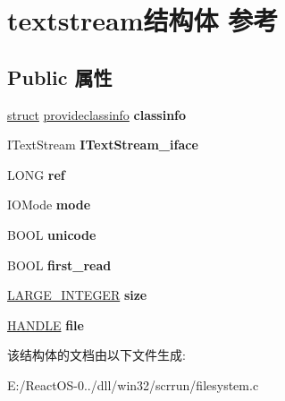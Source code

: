 \hypertarget{structtextstream}{}\section{textstream结构体 参考}
\label{structtextstream}
\subsection*{Public 属性}
\begin{DoxyCompactItemize}
\item 
\mbox{\label{structtextstream_a85e529673460ccf79baa7374fedab08e}} 
\hyperlink{interfacestruct}{struct} \hyperlink{structprovideclassinfo}{provideclassinfo} {\bfseries classinfo}
\item 
\mbox{\label{structtextstream_a68ec6da2e128bac649f245c699f9c0b7}} 
I\+Text\+Stream {\bfseries I\+Text\+Stream\+\_\+iface}
\item 
\mbox{\label{structtextstream_aa6ab5f97fa5849f7386821281af44870}} 
L\+O\+NG {\bfseries ref}
\item 
\mbox{\label{structtextstream_a24e10f6ff455f9db49da84fda8a8d5ef}} 
I\+O\+Mode {\bfseries mode}
\item 
\mbox{\label{structtextstream_a020994705dc826331d0bce551967be6e}} 
B\+O\+OL {\bfseries unicode}
\item 
\mbox{\label{structtextstream_a03be5a0d8e734fd9c9b59d2ee13a624a}} 
B\+O\+OL {\bfseries first\+\_\+read}
\item 
\mbox{\label{structtextstream_a97c0a836897c8e4ae2a5217a937e8980}} 
\hyperlink{union___l_a_r_g_e___i_n_t_e_g_e_r}{L\+A\+R\+G\+E\+\_\+\+I\+N\+T\+E\+G\+ER} {\bfseries size}
\item 
\mbox{\label{structtextstream_a65610602d0e428ccfe61b2467318a89c}} 
\hyperlink{interfacevoid}{H\+A\+N\+D\+LE} {\bfseries file}
\end{DoxyCompactItemize}


该结构体的文档由以下文件生成\+:\begin{DoxyCompactItemize}
\item 
E\+:/\+React\+O\+S-\/0../dll/win32/scrrun/filesystem.\+c\end{DoxyCompactItemize}
